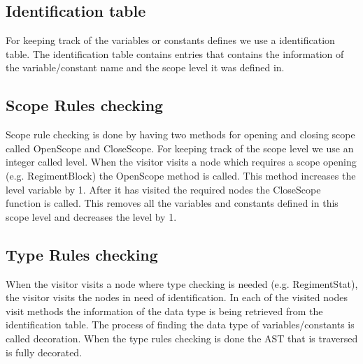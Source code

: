 	\subsection{Identification table}
		For keeping track of the variables or constants defines we use a identification table. The identification table contains entries
		that contains the information of the variable/constant name and the scope level it was defined in.
		
	\subsection{Scope Rules checking}
		Scope rule checking is done by having two methods for opening and closing scope called OpenScope and CloseScope. 
		For keeping track of the scope level we use an integer called level.
		When the visitor visits a node which requires a scope opening (e.g. RegimentBlock) the OpenScope method is called. 
		This method increases the level variable by 1. After it has visited the required nodes the CloseScope function is called. 
		This removes all the variables and constants defined in this scope level and decreases the level by 1.
	
	\subsection{Type Rules checking}
		When the visitor visits a node where type checking is needed (e.g. RegimentStat), the visitor visits the nodes 
		in need of identification. In each of the visited nodes visit methods the information of the data type is being retrieved 
		from the identification table. The process of finding the data type of variables/constants is called decoration. 
		When the type rules checking is done the AST that is traversed is fully decorated.
		
		